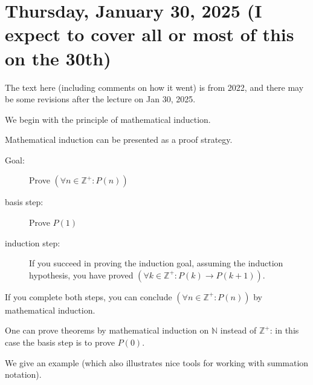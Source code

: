 \documentclass[12pt]{article}
\begin{document}
\newpage

\section{Thursday, January 30, 2025 (I expect to cover all or most of this on the 30th)}

The text here (including comments on how it went) is from 2022, and there may be some revisions after the lecture on Jan 30, 2025.

We begin with the principle of mathematical induction.

Mathematical induction can be presented as a proof strategy.

\begin{description}

\item[Goal:]  Prove $(\forall n \in {\mathbb Z}^+:P(n))$

\item[basis step:]  Prove $P(1)$

\item[induction step:]


If you succeed in proving the induction goal, assuming the induction hypothesis, you have proved $(\forall k \in {\mathbb Z}^+:P(k) \rightarrow P(k+1))$.



\end{description}
If you complete both steps, you can conclude $(\forall n \in {\mathbb Z}^+:P(n))$
 by mathematical induction.

One can prove theorems by mathematical induction on ${\mathbb N}$ instead of ${\mathbb Z}^+$:  in this case the basis step is to prove $P(0)$.

We give an example (which also illustrates nice tools for working with summation notation).
\end{document}
